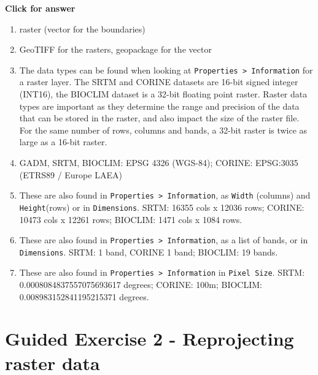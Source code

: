 \documentclass[
  letterpaper,
  DIV=11,
  numbers=noendperiod]{scrreprt}
\begin{document}
\begin{tcolorbox}[enhanced jigsaw, leftrule=.75mm, colframe=quarto-callout-important-color-frame, breakable, toprule=.15mm, bottomrule=.15mm, arc=.35mm, rightrule=.15mm, opacityback=0, colback=white, left=2mm]

\vspace{-3mm}\textbf{Click for answer}\vspace{3mm}

\begin{enumerate}
\def\labelenumi{\alph{enumi})}
\item
  raster (vector for the boundaries)
\item
  GeoTIFF for the rasters, geopackage for the vector
\item
  The data types can be found when looking at
  \texttt{Properties\ \textgreater{}\ Information} for a raster layer.
  The SRTM and CORINE datasets are 16-bit signed integer (INT16), the
  BIOCLIM dataset is a 32-bit floating point raster. Raster data types
  are important as they determine the range and precision of the data
  that can be stored in the raster, and also impact the size of the
  raster file. For the same number of rows, columns and bands, a 32-bit
  raster is twice as large as a 16-bit raster.
\item
  GADM, SRTM, BIOCLIM: EPSG 4326 (WGS-84); CORINE: EPSG:3035 (ETRS89 /
  Europe LAEA)
\item
  These are also found in
  \texttt{Properties\ \textgreater{}\ Information}, as \texttt{Width}
  (columns) and \texttt{Height}(rows) or in \texttt{Dimensions}. SRTM:
  16355 cols x 12036 rows; CORINE: 10473 cols x 12261 rows; BIOCLIM:
  1471 cols x 1084 rows.
\item
  These are also found in
  \texttt{Properties\ \textgreater{}\ Information}, as a list of bands,
  or in \texttt{Dimensions}. SRTM: 1 band, CORINE 1 band; BIOCLIM: 19
  bands.
\item
  These are also found in
  \texttt{Properties\ \textgreater{}\ Information} in
  \texttt{Pixel\ Size}. SRTM: 0.0008084837557075693617 degrees; CORINE:
  100m; BIOCLIM: 0.008983152841195215371 degrees.
\end{enumerate}

\end{tcolorbox}

\section{Guided Exercise 2 - Reprojecting raster
data}\label{guided-exercise-2---reprojecting-raster-data}
\end{document}
